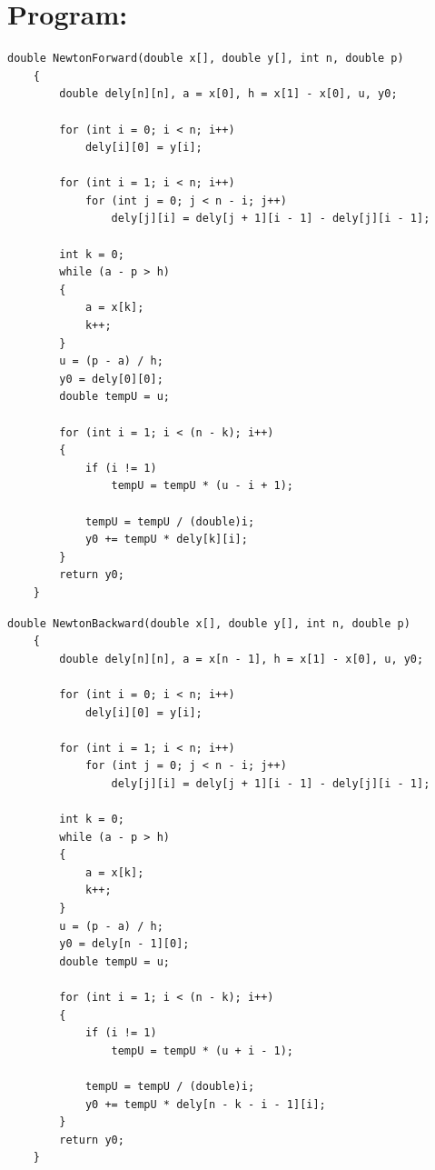 \documentclass[a4paper,12pt]{report}
\begin{document}
\section*{Program:}

\begin{lstlisting}[style=cppstyle, caption={Newton’s Forward Interpolation}, label={lst:cppcode}, basicstyle=\fontsize{10}{10}\selectfont\ttfamily]
    double NewtonForward(double x[], double y[], int n, double p)
    {
        double dely[n][n], a = x[0], h = x[1] - x[0], u, y0;
    
        for (int i = 0; i < n; i++)
            dely[i][0] = y[i];
    
        for (int i = 1; i < n; i++)
            for (int j = 0; j < n - i; j++)
                dely[j][i] = dely[j + 1][i - 1] - dely[j][i - 1];
    
        int k = 0;
        while (a - p > h)
        {
            a = x[k];
            k++;
        }
        u = (p - a) / h;
        y0 = dely[0][0];
        double tempU = u;
    
        for (int i = 1; i < (n - k); i++)
        {
            if (i != 1)
                tempU = tempU * (u - i + 1);
    
            tempU = tempU / (double)i;
            y0 += tempU * dely[k][i];
        }
        return y0;
    }
\end{lstlisting}

\begin{lstlisting}[style=cppstyle, caption={Newton’s Backward Interpolation}, label={lst:cppcode}, basicstyle=\fontsize{10}{10}\selectfont\ttfamily]
    double NewtonBackward(double x[], double y[], int n, double p)
    {
        double dely[n][n], a = x[n - 1], h = x[1] - x[0], u, y0;
    
        for (int i = 0; i < n; i++)
            dely[i][0] = y[i];
    
        for (int i = 1; i < n; i++)
            for (int j = 0; j < n - i; j++)
                dely[j][i] = dely[j + 1][i - 1] - dely[j][i - 1];
    
        int k = 0;
        while (a - p > h)
        {
            a = x[k];
            k++;
        }
        u = (p - a) / h;
        y0 = dely[n - 1][0];
        double tempU = u;
    
        for (int i = 1; i < (n - k); i++)
        {
            if (i != 1)
                tempU = tempU * (u + i - 1);
    
            tempU = tempU / (double)i;
            y0 += tempU * dely[n - k - i - 1][i];
        }
        return y0;
    }
\end{lstlisting}
\end{document}

